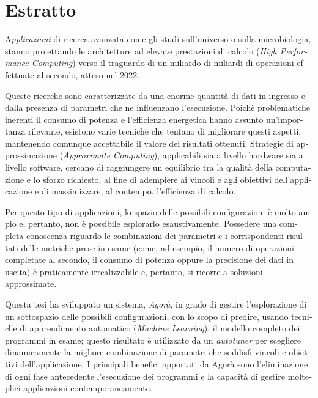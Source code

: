 \chapter*{Estratto}

\begin{otherlanguage}{italian}

\lettrine{A}{}\textit{pplicazioni} di ricerca avanzata come gli studi sull'universo o sulla microbiologia, stanno proiettando le architetture ad elevate prestazioni di calcolo (\textit{High Performance Computing}) verso il traguardo di un miliardo di miliardi di operazioni effettuate al secondo, atteso nel 2022.

Queste ricerche sono caratterizzate da una enorme quantità di dati in ingresso e dalla presenza di parametri che ne influenzano l'esecuzione. Poichè problematiche inerenti il consumo di potenza e l'efficienza energetica hanno assunto un'importanza rilevante, esistono varie tecniche che tentano di migliorare questi aspetti, mantenendo comunque accettabile il valore dei risultati ottenuti. Strategie di approssimazione (\textit{Ap\-prox\-i\-mate Com\-put\-ing}), applicabili sia a livello hardware sia a livello software, cercano di raggiungere un equilibrio tra la qualità della computazione e lo sforzo richiesto, al fine di adempiere ai vincoli e agli obiettivi dell'applicazione e di massimizzare, al contempo, l'efficienza di calcolo.

Per questo tipo di applicazioni, lo spazio delle possibili configurazioni è molto ampio e, pertanto, non è possibile esplorarlo esaustivamente. Possedere una completa conoscenza riguardo le combinazioni dei parametri e i corrispondenti risultati delle metriche prese in esame (come, ad esempio, il numero di operazioni completate al secondo, il consumo di potenza oppure la precisione dei dati in uscita) è praticamente irrealizzabile e, pertanto, si ricorre a soluzioni approssimate.

Questa tesi ha sviluppato un sistema, \textit{Agorà}, in grado di gestire l'esplorazione di un sottospazio delle possibili configurazioni, con lo scopo di predire, usando tecniche di apprendimento automatico (\textit{Machine Learning}), il modello completo dei programmi in esame; questo risultato è utilizzato da un \textit{autotuner} per sce\-glie\-re dinamicamente la migliore combinazione di parametri che soddisfi vincoli e obiettivi dell'applicazione. I principali benefici apportati da Agorà sono l'eliminazione di ogni fase an\-te\-ce\-den\-te l'esecuzione dei programmi e la capacità di gestire molteplici applicazioni contemporaneamente.

\end{otherlanguage}
